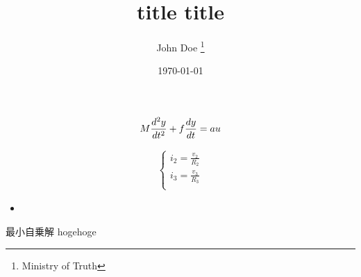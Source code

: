 \usepackage{"../packages"}
\usepackage{"../macros"}

\title{
    title title
}

\author{
    John Doe
    \thanks{Ministry of Truth}
}
\date{\today}



\maketitle

\tableofcontents

\begin{align}%
    M{d^2y \over dt^2}+f{dy \over dt}=au
    \label{diffeq1}
\end{align}%

\begin{align}%
    \left\{
        \begin{array}{llll}
            i_2=\frac{v_2}{R_2} \\
            i_3=\frac{v_3}{R_3} \\
        \end{array}
    \right.
\end{align}







\begin{itemize}%
    \item
\end{itemize}%

\begin{itembox}[l]{最小自乗解}%
    hogehoge
\end{itembox}%

\renewcommand{\bibname}{参考文献}



